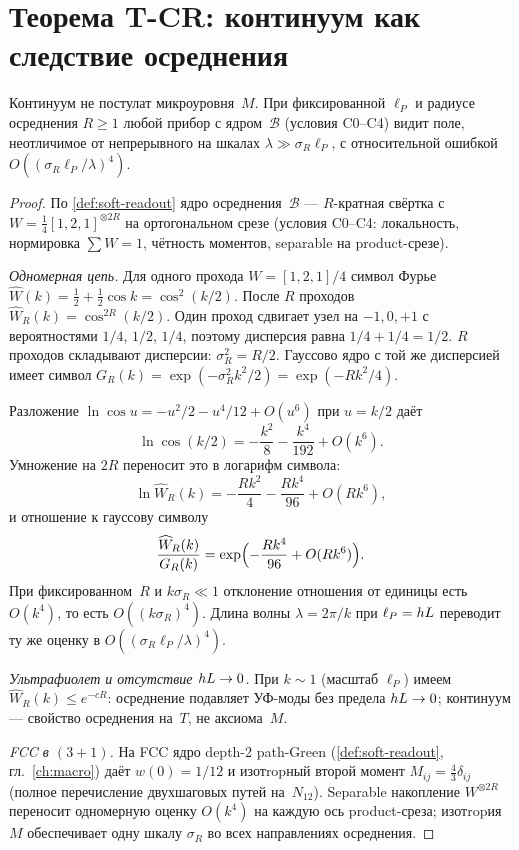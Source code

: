 \section{Теорема T-CR: континуум как следствие осреднения}
\label{sec:t-cr}

\begin{theorem}[T-CR]
\label{thm:t-cr}
Континуум не постулат микроуровня~$M$.
При фиксированной $\ell_P$ и радиусе осреднения $R\ge 1$
любой прибор с ядром~$\mathcal{B}$ (условия C0--C4) видит поле,
неотличимое от непрерывного на шкалах $\lambda\gg\sigma_R\ell_P$,
с относительной ошибкой $O((\sigma_R\ell_P/\lambda)^4)$.
\end{theorem}

\begin{proof}
По \cref{def:soft-readout} ядро осреднения~$\mathcal{B}$ --- $R$-кратная свёртка
с $W=\tfrac14[1,2,1]^{\otimes 2R}$ на ортогональном срезе (условия C0--C4:
локальность, нормировка $\sum W=1$, чётность моментов, separable на product-срезе).

\smallskip
\emph{Одномерная цепь.}
Для одного прохода $W=[1,2,1]/4$ символ Фурье
$\widehat W(k)=\tfrac12+\tfrac12\cos k=\cos^2(k/2)$.
После $R$ проходов $\widehat W_R(k)=\cos^{2R}(k/2)$.
Один проход сдвигает узел на $-1,0,+1$ с вероятностями $1/4$, $1/2$, $1/4$,
поэтому дисперсия равна $1/4+1/4=1/2$.
$R$ проходов складывают дисперсии: $\sigma_R^2=R/2$.
Гауссово ядро с той же дисперсией имеет символ $G_R(k)=\exp(-\sigma_R^2 k^2/2)=\exp(-Rk^2/4)$.

Разложение $\ln\cos u=-u^2/2-u^4/12+O(u^6)$ при $u=k/2$ даёт
\[
  \ln\cos(k/2)=-\frac{k^2}{8}-\frac{k^4}{192}+O(k^6).
\]
Умножение на $2R$ переносит это в логарифм символа:
\[
  \ln\widehat W_R(k)=-\frac{Rk^2}{4}-\frac{Rk^4}{96}+O(Rk^6),
\]
и отношение к гауссову символу
\[
  \frac{\widehat W_R(k)}{G_R(k)}=\exp\Bigl(-\frac{Rk^4}{96}+O(Rk^6)\Bigr).
\]
При фиксированном~$R$ и $k\sigma_R\ll 1$ отклонение отношения от единицы есть $O(k^4)$,
то есть $O((k\sigma_R)^4)$.
Длина волны $\lambda=2\pi/k$ при $\ell_P=hL$ переводит ту же оценку в $O((\sigma_R\ell_P/\lambda)^4)$.

\smallskip
\emph{Ультрафиолет и отсутствие $hL\to 0$.}
При $k\sim 1$ (масштаб $\ell_P$) имеем $\widehat W_R(k)\le e^{-cR}$: осреднение подавляет
УФ-моды без предела $hL\to 0$; континуум --- свойство осреднения на~$T$, не аксиома~$M$.

\smallskip
\emph{FCC в $(3{+}1)$.}
На FCC ядро depth-2 path-Green (\cref{def:soft-readout}, гл.~\ref{ch:macro})
даёт $w(0)=1/12$ и изотropный второй момент $M_{ij}=\tfrac43\delta_{ij}$
(полное перечисление двухшаговых путей на~$N_{12}$).
Separable накопление $W^{\otimes 2R}$ переносит одномерную оценку $O(k^4)$
на каждую ось product-среза; изотropия $M$ обеспечивает одну шкалу $\sigma_R$ во всех
направлениях осреднения.
\end{proof}

